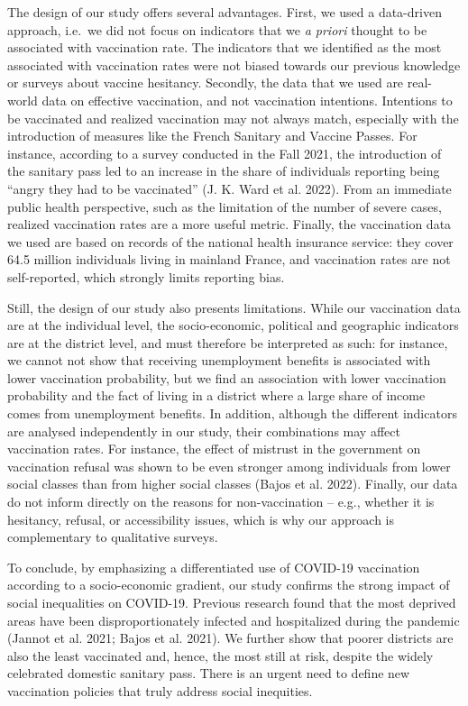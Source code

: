 \documentclass[
]{article}
\begin{document}
The design of our study offers several advantages. First, we used a data-driven approach, i.e.~we did not focus on indicators that we \emph{a priori} thought to be associated with vaccination rate. The indicators that we identified as the most associated with vaccination rates were not biased towards our previous knowledge or surveys about vaccine hesitancy. Secondly, the data that we used are real-world data on effective vaccination, and not vaccination intentions. Intentions to be vaccinated and realized vaccination may not always match, especially with the introduction of measures like the French Sanitary and Vaccine Passes. For instance, according to a survey conducted in the Fall 2021, the introduction of the sanitary pass led to an increase in the share of individuals reporting being ``angry they had to be vaccinated'' (J. K. Ward et al. 2022). From an immediate public health perspective, such as the limitation of the number of severe cases, realized vaccination rates are a more useful metric. Finally, the vaccination data we used are based on records of the national health insurance service: they cover 64.5 million individuals living in mainland France, and vaccination rates are not self-reported, which strongly limits reporting bias.

Still, the design of our study also presents limitations. While our vaccination data are at the individual level, the socio-economic, political and geographic indicators are at the district level, and must therefore be interpreted as such: for instance, we cannot not show that receiving unemployment benefits is associated with lower vaccination probability, but we find an association with lower vaccination probability and the fact of living in a district where a large share of income comes from unemployment benefits.
In addition, although the different indicators are analysed independently in our study, their combinations may affect vaccination rates. For instance, the effect of mistrust in the government on vaccination refusal was shown to be even stronger among individuals from lower social classes than from higher social classes (Bajos et al. 2022). Finally, our data do not inform directly on the reasons for non-vaccination -- e.g., whether it is hesitancy, refusal, or accessibility issues, which is why our approach is complementary to qualitative surveys.

To conclude, by emphasizing a differentiated use of COVID-19 vaccination according to a socio-economic gradient, our study confirms the strong impact of social inequalities on COVID-19. Previous research found that the most deprived areas have been disproportionately infected and hospitalized during the pandemic (Jannot et al. 2021; Bajos et al. 2021). We further show that poorer districts are also the least vaccinated and, hence, the most still at risk, despite the widely celebrated domestic sanitary pass. There is an urgent need to define new vaccination policies that truly address social inequities.
\end{document}
